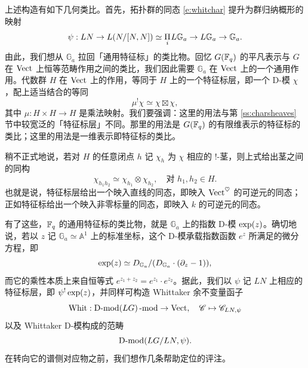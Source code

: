 \ssszh 上述构造有如下几何类比。首先，拓扑群的同态 \eqref{e:whitchar} 提升为群归纳概形的映射
\[
\psi: LN \rightarrow L(N/[N, N]) \simeq \underset i \Pi \hspace{.2mm}
L\mathbb{G}_a \rightarrow L\mathbb{G}_a \rightarrow \mathbb{G}_a.
\]
由此，我们想从 $\mathbb{G}_a$ 拉回「通用特征标」的类比物。回忆 $G(\mathbb{F}_q)$ 的平凡表示与 $G$ 在 $\operatorname{Vect}$ 上恒等范畴作用之间的类比，我们因此需要 $\mathbb{G}_a$ 在 $\operatorname{Vect}$ 上的一个通用作用。代数群 $H$ 在 $\operatorname{Vect}$ 上的作用，等同于 $H$ 上的一个特征标层，即一个 D-模 $\chi$，配上适当结合的等同
\[
\mu^! \chi \simeq \chi \boxtimes \chi,
\]
其中 $\mu: H \times H \rightarrow H$ 是乘法映射。我们要强调：这里的用法与第 \ref{ss:charsheaves} 节中较宽泛的「特征标层」不同。那里的用法是 $G(\mathbb{F}_q)$ 的有限维表示的特征标的类比；这里的用法是一维表示即特征标的类比。

\begin{re} 稍不正式地说，若对 $H$ 的任意闭点 $h$ 记 $\chi_h$ 为 $\chi$ 相应的 $!$-茎，则上式给出茎之间的同构
\[
\chi_{h_1 h_2} \simeq \chi_{h_1} \otimes \chi_{h_2}, \quad \text{对 } h_1,
h_2 \in H.
\]
也就是说，特征标层给出一个映入直线的同态，即映入 $\operatorname{Vect}^\heartsuit$ 的可逆元的同态；正如特征标给出一个映入非零标量的同态，即映入 $k$ 的可逆元的同态。
\end{re}

有了这些，$\mathbb{F}_q$ 的通用特征标的类比物，就是 $\mathbb{G}_a$ 上的指数 D-模 $\operatorname{exp}(z)$。确切地说，若以 $z$ 记 $\mathbb{G}_a \simeq \mathbb{A}^1$ 上的标准坐标，这个 D-模承载指数函数 $e^z$ 所满足的微分方程，即
\[
\operatorname{exp}(z) \simeq D_{\mathbb{G}_a} / ( D_{\mathbb{G}_a} \cdot (\partial_z -
1)),
\]
而它的乘性本质上来自恒等式 $e^{z_1 + z_2} = e^{z_1} \cdot e^{z_2}$。据此，我们以 $\psi$ 记 $LN$ 上相应的特征标层，即 $\psi^! \operatorname{exp}(z)$，并同样可构造 Whittaker 余不变量函子
\[
\operatorname{Whit}: \operatorname{D-mod}(LG)\operatorname{-mod} \rightarrow \operatorname{Vect}, \quad \mathscr{C} \mapsto \mathscr{C}_{LN,
\psi}
\]
以及 Whittaker D-模构成的范畴
\begin{equation} \label{e:catwhitsheaves}
\operatorname{D-mod}(LG / LN, \psi).
\end{equation}
在转向它的谱侧对应物之前，我们想作几条帮助定位的评注。

